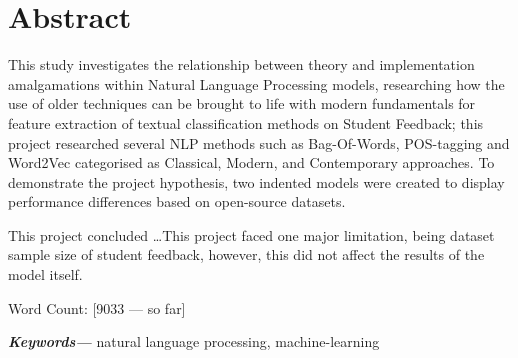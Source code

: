 \documentclass[12pt, a4paper]{report}
\providecommand{\keywords}[1]
{
  \small
  \textbf{\textit{Keywords---}} #1
}
\begin{document}
\chapter*{Abstract}	%


This study investigates the relationship between theory and implementation amalgamations within Natural Language Processing models, researching how the use of older techniques can be brought to life with modern fundamentals for feature extraction of textual classification methods on Student Feedback; this project researched several NLP methods such as Bag-Of-Words, POS-tagging and Word2Vec categorised as Classical, Modern, and Contemporary approaches. To demonstrate the project hypothesis, two indented models were created to display performance differences based on open-source datasets.

This project concluded \ldots This project faced one major limitation, being dataset sample size of student feedback, however, this did not affect the results of the model itself.

Word Count: [9033 --- so far]


\indent \keywords{natural language processing, machine-learning}

\newpage
\renewcommand{\contentsname}{Table of Contents}	%
\tableofcontents

\newpage
{}	%
\listoftables

\newpage
{}	%
\listoffigures


\newpage

{}
\end{document}
